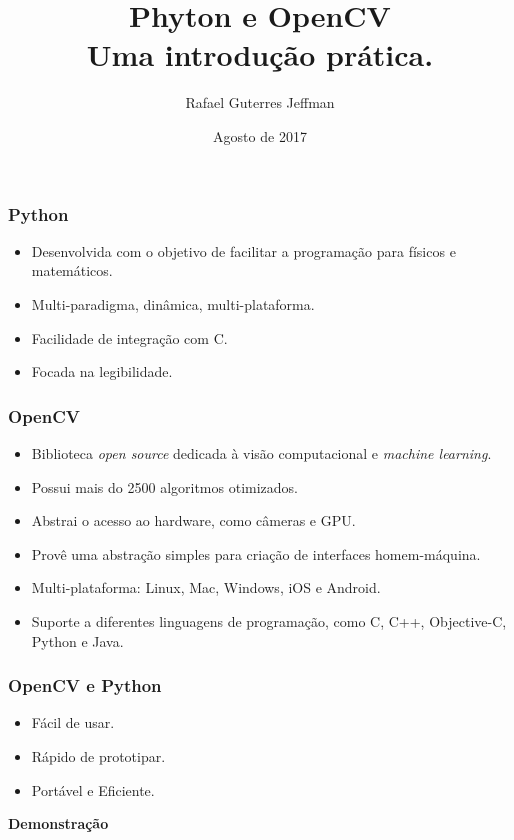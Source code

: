 \documentclass[aspectratio=169,14pt]{beamer}
\title[]{\color{black} \textbf{Phyton e OpenCV \\ Uma introdução prática.}}
\author[]{Rafael Guterres Jeffman}
\institute[]{Faculdade Senac Porto Alegre \\ Tchelinux}
\date{Agosto de 2017}
\begin{document}
\begin{frame}
    \titlepage
\end{frame}


\begin{frame}
    \frametitle{Python}
    \begin{itemize}
        \item{Desenvolvida com o objetivo de facilitar a programação para
        físicos e matemáticos.}
        \item{Multi-paradigma, dinâmica, multi-plataforma.}
        \item{Facilidade de integração com C.}
        \item{Focada na legibilidade.}
    \end{itemize}
\end{frame}

\begin{frame}
    \frametitle{OpenCV}
    \begin{itemize}
        \item{Biblioteca \emph{open source} dedicada à visão computacional
        e \emph{machine learning}.}
        \item{Possui mais do 2500 algoritmos otimizados.}
        \item{Abstrai o acesso ao hardware, como câmeras e GPU.}
        \item{Provê uma abstração simples para criação de interfaces
        homem-máquina.}
        \item{Multi-plataforma: Linux, Mac, Windows, iOS e Android.}
        \item{Suporte a diferentes linguagens de programação, como
        C, C++, Objective-C, Python e Java.}
    \end{itemize}
\end{frame}

\begin{frame}
    \frametitle{OpenCV e Python}
    \begin{itemize}
        \item{Fácil de usar.}
        \item{Rápido de prototipar.}
        \item{Portável e Eficiente.}
    \end{itemize}
\end{frame}

\begin{frame}[c]
    \begin{center}
    \Huge \textbf{Demonstração}
    \end{center}
\end{frame}
\end{document}
